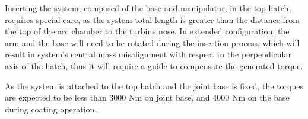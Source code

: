 Inserting the system, composed of the base and manipulator, in the top
hatch, requires special care, as the system total length is greater
than the distance from the top of the arc chamber to the turbine nose. In
extended configuration, the arm and the base will need to be rotated during the
insertion process, which will result in system's central mass misalignment with respect to the
perpendicular axis of the hatch, thus it will require a guide to compensate
the generated torque.



As the system is attached to the top hatch and the joint base is fixed,
the torques are expected to be less than 3000 Nm on joint base, and 4000 Nm on
the base during coating operation.



